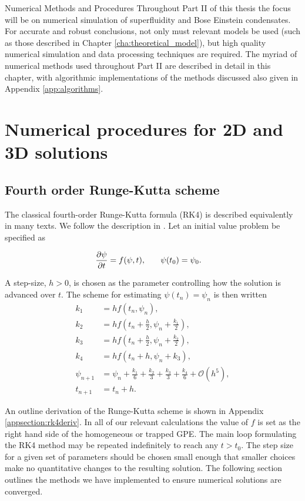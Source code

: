 \begin{chapter}{\label{cha:numerics}Numerical Methods and Procedures}
Throughout Part II of this thesis the focus will be on numerical simulation of superfluidity and Bose Einstein condensates. For accurate and robust conclusions, not only must relevant models be used (such as those described in Chapter \ref{cha:theoretical_model}), but high quality numerical simulation and data processing techniques are required. The myriad of numerical methods used throughout Part II are described in detail in this chapter, with algorithmic implementations of the methods discussed also given in Appendix \ref{app:algorithms}.
\section{\label{section:RK} Numerical procedures for 2D and 3D solutions}
	\subsection{\label{section:RK4} Fourth order Runge-Kutta scheme}
	The classical fourth-order Runge-Kutta formula (RK4) is described equivalently in many texts. We follow the description in \cite{NumericalRecipes}. Let an initial value problem be specified as
	
	\begin{align*}
		\frac{\partial \psi}{\partial t} &= f(\psi,t),\hspace{0.25in}\psi(t_0) = \psi_0.
	\end{align*}

A step-size, $h>0$, is chosen as the parameter controlling how the solution is advanced over $t$. The scheme for estimating $\psi(t_n)= \psi_n$ is then written
\begin{equation}
\begin{split}
		k_1 &= hf(t_n,\psi_n),\\
		k_2 &= hf(t_n+\frac{h}{2},\psi_n+\frac{k_1}{2}),\\
		k_3 &= hf(t_n+\frac{h}{2},\psi_n+\frac{k_2}{2}),\\
		k_4 &= hf(t_n+h,\psi_n+k_3),\\
		\psi_{n+1} &= \psi_n + \frac{k_1}{6}+ \frac{k_2}{3}+ \frac{k_3}{3} + \frac{k_4}{6} + \mathcal{O}(h^5),\\
		t_{n+1}  &= t_n + h.
		\label{eq:rk4}
\end{split}
\end{equation}


	An outline derivation of the Runge-Kutta scheme is shown in Appendix \ref{appsection:rk4deriv}.	In all of our relevant calculations the value of $f$ is set as the right hand side of the homogeneous or trapped GPE. The main loop formulating the RK4 method may be repeated indefinitely to reach any $t>t_0$. The step size for a given set of parameters should be chosen small enough that smaller choices make no quantitative changes to the resulting solution. The following section outlines the methods we have implemented to ensure numerical solutions are converged.


\end{chapter}
